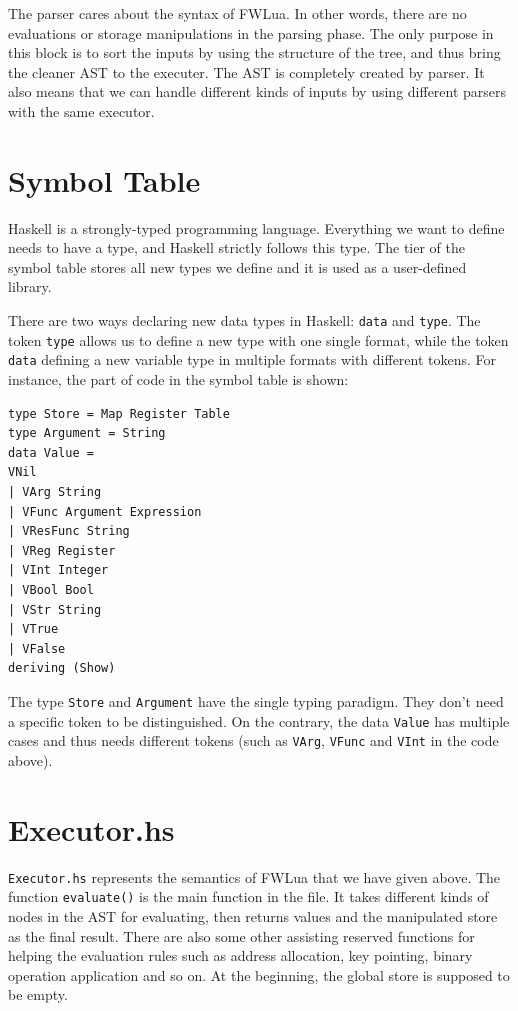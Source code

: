 The parser cares about the syntax of FWLua. In other words, there are no evaluations or storage manipulations in the parsing phase. The only purpose in this block is to sort the inputs by using the structure of the tree, and thus bring the cleaner AST to the executer. The AST is completely created by parser. It also means that we can handle different kinds of inputs by using different parsers with the same executor.

\section{Symbol Table}
Haskell is a strongly-typed programming language. Everything we want to define needs to have a type, and Haskell strictly follows this type. The tier of the symbol table stores all new types we define and it is used as a user-defined library.

There are two ways declaring new data types in Haskell: {\tt data} and {\tt type}. The token {\tt type} allows us to define a new type with one single format, while the token {\tt data} defining a new variable type in multiple formats with different tokens. For instance, the part of code in the symbol table is shown:

\begin{verbatim}
type Store = Map Register Table
type Argument = String
data Value = 
VNil
| VArg String
| VFunc Argument Expression
| VResFunc String
| VReg Register
| VInt Integer
| VBool Bool
| VStr String
| VTrue
| VFalse
deriving (Show)
\end{verbatim}

The type {\tt Store} and {\tt Argument} have the single typing paradigm. They don't need a specific token to be distinguished. On the contrary, the data {\tt Value} has multiple cases and thus needs different tokens (such as {\tt VArg}, {\tt VFunc} and {\tt VInt} in the code above).

\section{Executor.hs}
{\tt Executor.hs} represents the semantics of FWLua that we have given above. The function {\tt evaluate()} is the main function in the file. It takes different kinds of nodes in the AST for evaluating, then returns values and the manipulated store as the final result. There are also some other assisting reserved functions for helping the evaluation rules such as address allocation, key pointing, binary operation application and so on. At the beginning, the global store is supposed to be empty.

